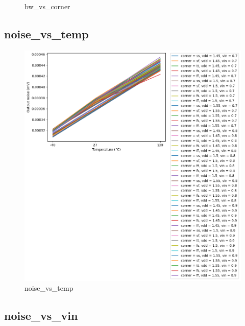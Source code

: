 \documentclass[
  a4paper,
  DIV=11,
  numbers=noendperiod]{scrartcl}
\begin{document}
\begin{tcolorbox}
\begin{figure}[H]
{}

\caption{bw\_vs\_corner}

\end{figure}%

\subsection{noise\_vs\_temp}\label{noise_vs_temp}

\begin{figure}[H]

{\centering \includegraphics{./cace/_docs/ota-5t/schematic/noise_vs_temp.png}

}

\caption{noise\_vs\_temp}

\end{figure}%

\subsection{noise\_vs\_vin}\label{noise_vs_vin}

\begin{figure}[H]


\end{figure}
\end{tcolorbox}
\end{document}
